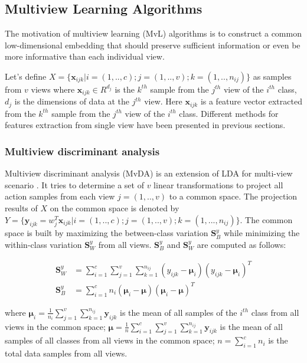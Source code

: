 
\subsection{Multiview Learning Algorithms}

    The motivation of multiview learning (MvL) algorithms is to construct a common low-dimensional embedding that should preserve sufficient information or even be more informative than each individual view.

    Let's define $X = \{\boldsymbol{x}_{ijk}|i=(1,..,c);j = (1,..,v);k=(1,..,n_{ij})\}$ as samples from $v$ views where $\boldsymbol{x}_{ijk} \in R^{d_j}$ is the $k^{th}$ sample from the $j^{th}$ view of the $i^{th}$ class, $d_j$ is the dimensions of data at the $j^{th}$ view.
    Here ${\boldsymbol x}_{ijk}$ is a feature vector extracted from the $k^{th}$ sample from the $j^{th}$ view of the $i^{th}$ class.
    Different methods for features extraction from single view have been presented in previous sections. 

    \subsubsection{Multiview discriminant analysis}
        Multiview discriminant analysis (MvDA) is an extension of LDA for multi-view scenario \cite{kan2015multi}.
        It tries to determine a set of $v$ linear transformations to project all action samples from each view $j = (1,..,v)$ to a common space.
        The projection results of $X$ on the common space is denoted by $Y = \{\boldsymbol{y}_{ijk} = w_j^T\boldsymbol{x}_{ijk}|i=(1,..,c); j=(1,..,v); k=(1,...,n_{ij})\}$.
        The common space is built by maximizing the between-class variation $\boldsymbol{S}_B^y$ while minimizing the within-class variation $\boldsymbol{S}_W^y$ from all views. $\boldsymbol{S}_B^y$ and $\boldsymbol{S}_W^y$ are computed as follows: 

        \begin{align}
            \boldsymbol{S}_W^y &= \sum_{i=1}^{c}\sum_{j=1}^{v}\sum_{k=1}^{n_{ij}}(y_{ijk}-\boldsymbol{\mu}_i)(y_{ijk}-\boldsymbol{\mu}_i)^T \label{eq:MvDA_Sw}\\
            \boldsymbol{S}_B^y &= \sum_{i=1}^{c}n_i(\boldsymbol{\mu}_i - \boldsymbol{\mu})(\boldsymbol{\mu}_i - \boldsymbol{\mu})^T \label{eq:MvDA_Sb}
        \end{align}

        where $\boldsymbol{\mu}_i=\frac{1}{n_i}\sum_{j=1}^{v}{\sum_{k=1}^{n_{ij}}}{\boldsymbol{y}_{ijk}}$ is the mean of all samples of the $i^{th}$ class from all views in the common space; $\boldsymbol{\mu}=\frac{1}{n}\sum_{i=1}^{c}\sum_{j=1}^{v}{\sum_{k=1}^{n_{ij}}{\boldsymbol{y}_{ijk}}}$ is the mean of all samples of all classes from all views in the common space; $n=\sum_{i=1}^{c}n_i$ is the total data samples from all views.

